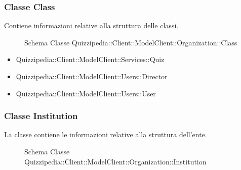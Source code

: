 \subsubsection{Classe Class}
Contiene informazioni relative alla struttura delle classi.
\begin{figure}[H]
\centering
\noindent{}
\caption{Schema Classe Quizzipedia::Client::ModelClient::Organization::Class}
\end{figure}
\begin{itemize}
\item Quizzipedia::Client::ModelClient::Services::Quiz
\item Quizzipedia::Client::ModelClient::Users::Director
\item Quizzipedia::Client::ModelClient::Users::User
\end{itemize}
\subsubsection{Classe Institution}
La classe contiene le informazioni relative alla struttura dell'ente.
\begin{figure}[H]
\centering
\noindent{}
\caption{Schema Classe Quizzipedia::Client::ModelClient::Organization::Institution}
\end{figure}
